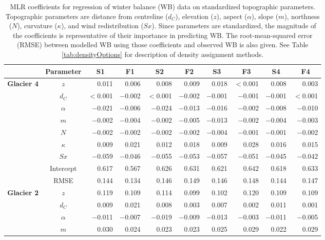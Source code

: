 \documentclass{sfuthesis}
\newcommand{\params}{Topographic parameters are distance from centreline ($d_C$), elevation ($z$), aspect ($\alpha$), slope ($m$), northness ($N$), curvature ($\kappa$), and wind redistribution ($Sx$). }
\begin{document}
\begin{table}
\footnotesize
\centering
\caption{MLR coefficients for regression of winter balance (WB) data on standardized topographic parameters. \params  Since parameters are standardized, the magnitude of the coefficients is representative of their importance in predicting WB. The root-mean-squared error (RMSE) between modelled WB using those coefficients and observed WB is also given. See Table \ref{tab:densityOptions} for description of density assignment methods.}
\label{tab:MLRcoeffFull}
\begin{tabular}{ccrrrrrrrr}
 & \textbf{Parameter} & \multicolumn{1}{c}{\textbf{S1}} & \multicolumn{1}{c}{\textbf{F1}} & \multicolumn{1}{c}{\textbf{S2}} & \multicolumn{1}{c}{\textbf{F2}} & \multicolumn{1}{c}{\textbf{S3}} & \multicolumn{1}{c}{\textbf{F3}} & \multicolumn{1}{c}{\textbf{S4}} & \multicolumn{1}{c}{\textbf{F4}} \\ \hline \hline
\multirow{9}{*}{\textbf{Glacier 4}} & $z$ & 0.011 & 0.006 & 0.008 & 0.009 & 0.018 & $<$0.001 & 0.008 & 0.003 \\
 & $d_C$ & $<$0.001 & $-$0.002 & $<$0.001 & $-$0.002 & $-$0.001 & $-$0.001 & $-$0.001 & $<$0.001 \\
 & $\alpha$ & $-$0.021 & $-$0.006 & $-$0.024 & $-$0.013 & $-$0.016 & $-$0.002 & $-$0.008 & $-$0.010 \\
 & $m$ & $-$0.002 & $-$0.004 & $-$0.002 & $-$0.005 & $-$0.013 & $-$0.002 & $-$0.004 & $-$0.003 \\
 & $N$ & $-$0.002 & $-$0.002 & $-$0.002 & $-$0.002 & $-$0.004 & $-$0.001 & $-$0.001 & $-$0.002 \\
 & $\kappa$ & 0.009 & 0.021 & 0.012 & 0.018 & 0.009 & 0.028 & 0.016 & 0.015 \\
 & $Sx$ & $-$0.059 & $-$0.046 & $-$0.055 & $-$0.053 & $-$0.057 & $-$0.051 & $-$0.045 & $-$0.042 \\
 & Intercept & 0.617 & 0.567 & 0.626 & 0.631 & 0.621 & 0.642 & 0.618 & 0.633 \\
 & RMSE & 0.144 & 0.134 & 0.146 & 0.149 & 0.146 & 0.148 & 0.144 & 0.147 \\ \hline
\multirow{9}{*}{\textbf{Glacier 2}} & $z$ & 0.119 & 0.109 & 0.114 & 0.099 & 0.102 & 0.120 & 0.109 & 0.109 \\
 & $d_C$ & 0.009 & 0.021 & 0.008 & 0.003 & 0.007 & 0.002 & 0.011 & 0.001 \\
 & $\alpha$ & $-$0.011 & $-$0.007 & $-$0.019 & $-$0.009 & $-$0.013 & $-$0.003 & $-$0.011 & $-$0.005 \\
 & $m$ & 0.030 & 0.024 & 0.023 & 0.023 & 0.025 & 0.029 & 0.022 & 0.029 \\

\end{tabular}
\end{table}
\end{document}
